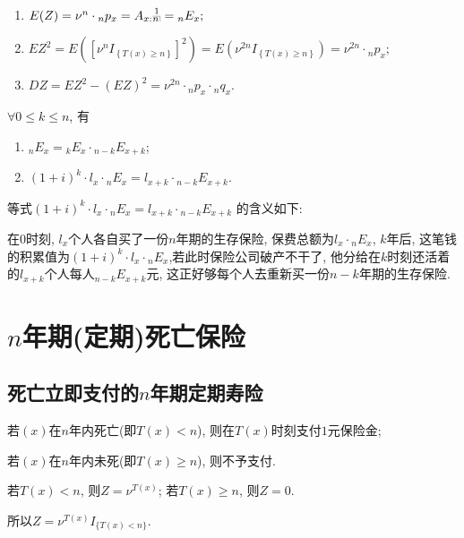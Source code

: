 \documentclass[lang=cn,10pt]{elegantbook}
\makeatletter
\DeclareRobustCommand{\annu}[1]{_{%
    \def\arraystretch{0}%
    \setlength\arraycolsep{1pt}%
    \setlength\arrayrulewidth{.2pt}%
    \begin{array}[b]{@{}c|}\hline
        \\[\arraycolsep]%
        \scriptstyle #1%
    \end{array}%
}}
\makeatother
\begin{document}
\begin{proposition}[精算现值与方差]
	\begin{enumerate}
		\item $E(Z)=\nu^n\cdot{}_np_x=A_{x:}\overset{1}{{}\annu{n}}={}_nE_x;$
		\item $E Z^2 =E\left( \left[ \nu^nI_{\left\{ T\left( x \right) \geqslant n \right\}} \right] ^2 \right) =E\left( \nu^{2n}I_{\left\{ T\left( x \right) \geqslant n \right\}} \right) =\nu^{2n}\cdot{}_np_x;$
		\item $DZ=EZ^2-\left( EZ \right) ^2=\nu^{2n}\cdot{}_np_x\cdot{}_nq_x.$
	\end{enumerate}
\end{proposition}

\begin{corollary}[精算现值的性质]
	$\forall 0\leqslant k\leqslant n$, 有
	\begin{enumerate}
		\item $_nE_x={}_kE_x\cdot {}_{n-k}E_{x+k}$;
		\item $(1+i)^k\cdot l_x\cdot{}_nE_x=l_{x+k}\cdot {}_{n-k}E_{x+k}$.
	\end{enumerate}
\end{corollary}

\begin{remark}
    等式$(1+i)^k\cdot l_x\cdot {}_nE_x=l_{x+k}\cdot {}_{n-k}E_{x+k}$ 的含义如下:

    在$0$时刻, $l_x$个人各自买了一份$n$年期的生存保险, 保费总额为$l_x\cdot {}_nE_x$, $k$年后, 这笔钱的积累值为$(1+i)^k\cdot l_x\cdot {}_nE_x$,若此时保险公司破产不干了, 他分给在$k$时刻还活着的$l_{x+k}$个人每人${}_{n-k}E_{x+k}$元, 这正好够每个人去重新买一份$n-k$年期的生存保险.
\end{remark}

\section{$n$年期(定期)死亡保险}

\subsection{死亡立即支付的$n$年期定期寿险}
\begin{definition}[支付现值]
	若$(x)$在$n$年内死亡(即$T(x)<n$), 则在$T(x)$时刻支付$1$元保险金;

若$(x)$在$n$年内未死(即$T(x)\geqslant n$), 则不予支付.

若$T(x)<n$, 则$Z=\nu^{T(x)}$; 若$T(x)\geqslant n$, 则$Z=0$.

所以$Z=\nu^{T(x)}I_{\{T(x)<n\}}.$
\end{definition}
\end{document}
